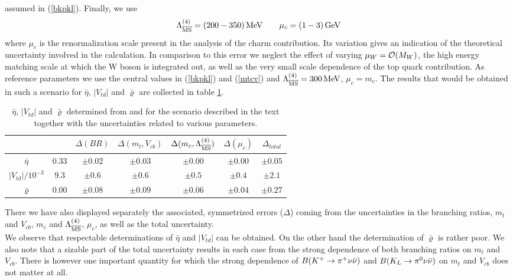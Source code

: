 assumed in (\ref{bkpkl}).
Finally, we use
\begin{equation}\label{lamuc}
\Lambda_{\overline{\rm MS}}^{(4)}=(200 - 350)\, {\rm MeV} \qquad \mu_c=(1-3)\, {\rm GeV}
\end{equation}
where $\mu_c$ is the renormalization scale present in the analysis of
the charm contribution. Its variation gives an indication of the
theoretical uncertainty involved in the calculation.  In comparison to
this error we neglect the effect of varying $\mu_W={\cal O}(M_W)$, the high
energy matching scale at which the W boson is integrated out, as well
as the very small scale dependence of the top quark contribution.  As
reference parameters we use the central values in (\ref{bkpkl}) and
(\ref{mtcv}) and $\Lambda_{\overline{\rm MS}}^{(4)} = 300\, {\rm MeV}$, $\mu_c=m_c$.  The results that
would be obtained in such a scenario for $\bar\eta$, $|V_{td}|$ and
$\bar\varrho$ are collected in table \ref{tab:utkpnn}.

\begin{table}[htb]
\caption[]{$\bar\eta$, $|V_{td}|$ and $\bar\varrho$ determined from
\kpnn and \klpnn for the scenario described in the text together with
the uncertainties related to various parameters.
\label{tab:utkpnn}}
\begin{center}
\begin{tabular}{|c||c||c|c|c|c||c|}
&&$\Delta(BR)$&$\Delta(m_t, V_{cb})$&$\Delta(m_c,\Lambda_{\overline{\rm MS}}^{(4)})
$&$\Delta(\mu_c)$&$\Delta_{total}$\\ \hline
$\bar\eta$&$0.33$&$\pm 0.02$&$\pm 0.03$&$\pm 0.00$&$\pm 0.00$&
$\pm 0.05$\\ \hline
$|V_{td}|/10^{-3}$&$9.3$&$\pm 0.6$&$\pm 0.6$&$\pm 0.5$&$\pm 0.4$&
$\pm 2.1$\\ \hline
$\bar\varrho$&$0.00$&$\pm 0.08$&$\pm 0.09$&$\pm 0.06$&$\pm 0.04$&
$\pm 0.27$
\end{tabular}
\end{center}
\end{table}

There we have also displayed separately the associated, symmetrized
errors ($\Delta$) coming from the uncertainties in the branching ratios,
$m_t$ and $V_{cb}$, $m_c$ and $\Lambda_{\overline{\rm MS}}^{(4)}$, $\mu_c$,
as well as the total uncertainty.
\\
We observe that respectable determinations of $\bar\eta$ and
$|V_{td}|$ can be obtained. On the other hand the determination of
$\bar\varrho$ is rather poor. We also note that a sizable part of the
total uncertainty results in each case from the strong dependence of
both branching ratios on $m_t$ and $V_{cb}$. There is however one
important quantity for which the strong dependence of $B(K^+ \to \pi^+\nu\bar\nu)$ and
$B(K_L \to \pi^0\nu\bar\nu)$ on $m_t$ and $V_{cb}$ does not matter at all.

